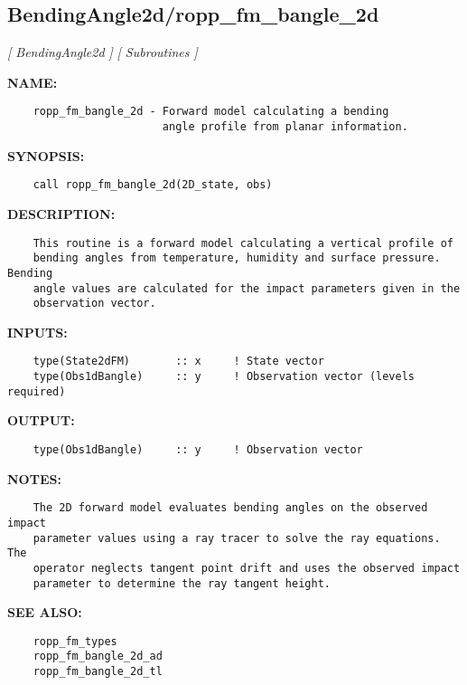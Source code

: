 \subsection{BendingAngle2d/ropp\_fm\_bangle\_2d}
\textsl{[ BendingAngle2d ]}
\textsl{[ Subroutines ]}

\label{ch:robo10}
\label{ch:BendingAngle2d_ropp_fm_bangle_2d}
\textbf{NAME:}\hspace{0.08in}\begin{Verbatim}
    ropp_fm_bangle_2d - Forward model calculating a bending
                        angle profile from planar information.
\end{Verbatim}
\textbf{SYNOPSIS:}\hspace{0.08in}\begin{Verbatim}
    call ropp_fm_bangle_2d(2D_state, obs)
\end{Verbatim}
\textbf{DESCRIPTION:}\hspace{0.08in}\begin{Verbatim}
    This routine is a forward model calculating a vertical profile of 
    bending angles from temperature, humidity and surface pressure. Bending
    angle values are calculated for the impact parameters given in the
    observation vector.
\end{Verbatim}
\textbf{INPUTS:}\hspace{0.08in}\begin{Verbatim}
    type(State2dFM)       :: x     ! State vector
    type(Obs1dBangle)     :: y     ! Observation vector (levels required)
\end{Verbatim}
\textbf{OUTPUT:}\hspace{0.08in}\begin{Verbatim}
    type(Obs1dBangle)     :: y     ! Observation vector
\end{Verbatim}
\textbf{NOTES:}\hspace{0.08in}\begin{Verbatim}
    The 2D forward model evaluates bending angles on the observed impact
    parameter values using a ray tracer to solve the ray equations. The
    operator neglects tangent point drift and uses the observed impact
    parameter to determine the ray tangent height. 
\end{Verbatim}
\textbf{SEE ALSO:}\hspace{0.08in}\begin{Verbatim}
    ropp_fm_types
    ropp_fm_bangle_2d_ad
    ropp_fm_bangle_2d_tl
\end{Verbatim}
